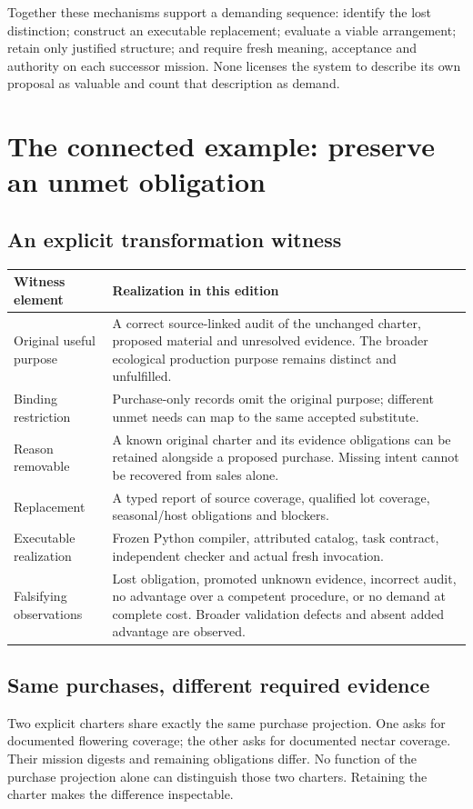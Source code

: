 \documentclass[11pt]{article}
\begin{document}
Together these mechanisms support a demanding sequence: identify the lost distinction; construct an executable replacement; evaluate a viable arrangement; retain only justified structure; and require fresh meaning, acceptance and authority on each successor mission. None licenses the system to describe its own proposal as valuable and count that description as demand.

\Needspace{.55\textheight}
\section{The connected example: preserve an unmet obligation}
\subsection{An explicit transformation witness}
\begin{tabularx}{\textwidth}{@{}p{35mm}Y@{}}
\toprule
Witness element & Realization in this edition\\\midrule
Original useful purpose & A correct source-linked audit of the unchanged charter, proposed material and unresolved evidence. The broader ecological production purpose remains distinct and unfulfilled.\\
Binding restriction & Purchase-only records omit the original purpose; different unmet needs can map to the same accepted substitute.\\
Reason removable & A known original charter and its evidence obligations can be retained alongside a proposed purchase. Missing intent cannot be recovered from sales alone.\\
Replacement & A typed report of source coverage, qualified lot coverage, seasonal/host obligations and blockers.\\
Executable realization & Frozen Python compiler, attributed catalog, task contract, independent checker and actual fresh invocation.\\
Falsifying observations & Lost obligation, promoted unknown evidence, incorrect audit, no advantage over a competent procedure, or no demand at complete cost. Broader validation defects and absent added advantage are observed.\\
\bottomrule
\end{tabularx}

\subsection{Same purchases, different required evidence}
 Two explicit charters share exactly the same purchase projection. One asks for documented flowering coverage; the other asks for documented nectar coverage. Their mission digests and remaining obligations differ. No function of the purchase projection alone can distinguish those two charters. Retaining the charter makes the difference inspectable.
\end{document}
